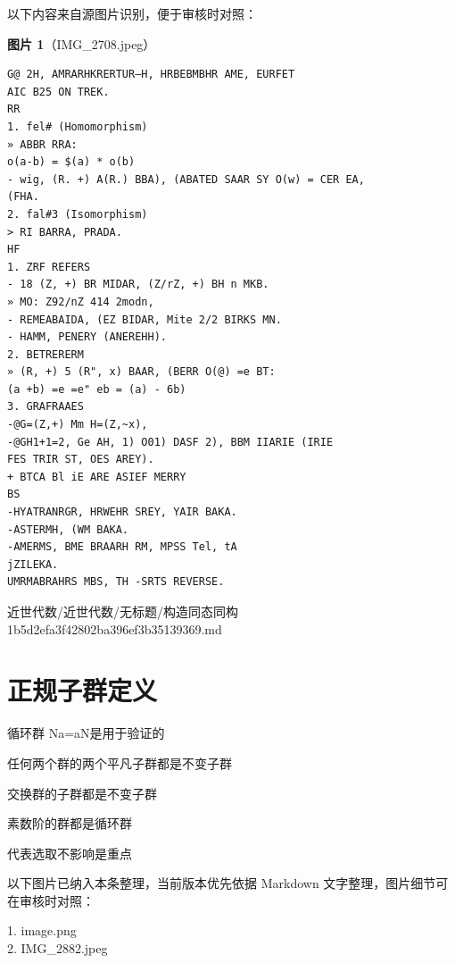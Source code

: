 \begin{note}
以下内容来自源图片识别，便于审核时对照：

\textbf{图片 1}（IMG\_2708.jpeg）
\begin{Verbatim}[fontsize=\small]
G@ 2H, AMRARHKRERTUR—H, HRBEBMBHR AME, EURFET
AIC B25 ON TREK.
RR
1. fel# (Homomorphism)
» ABBR RRA:
o(a-b) = $(a) * o(b)
- wig, (R. +) A(R.) BBA), (ABATED SAAR SY O(w) = CER EA,
(FHA.
2. fal#3 (Isomorphism)
> RI BARRA, PRADA.
HF
1. ZRF REFERS
- 18 (Z, +) BR MIDAR, (Z/rZ, +) BH n MKB.
» MO: Z92/nZ 414 2modn,
- REMEABAIDA, (EZ BIDAR, Mite 2/2 BIRKS MN.
- HAMM, PENERY (ANEREHH).
2. BETRERERM
» (R, +) 5 (R", x) BAAR, (BERR O(@) =e BT:
(a +b) =e =e" eb = (a) - 6b)
3. GRAFRAAES
-@G=(Z,+) Mm H=(Z,~x),
-@GH1+1=2, Ge AH, 1) O01) DASF 2), BBM IIARIE (IRIE
FES TRIR ST, OES AREY).
+ BTCA Bl iE ARE ASIEF MERRY
BS
-HYATRANRGR, HRWEHR SREY, YAIR BAKA.
-ASTERMH, (WM BAKA.
-AMERMS, BME BRAARH RM, MPSS Tel, tA
jZILEKA.
UMRMABRAHRS MBS, TH -SRTS REVERSE.
\end{Verbatim}

\end{note}

\begin{note}[来源路径]

近世代数/近世代数/无标题/构造同态同构 1b5d2efa3f42802ba396ef3b35139369.md

\end{note}

\section*{正规子群定义}

\begin{definition}[正规子群定义]

循环群 Na=aN是用于验证的

任何两个群的两个平凡子群都是不变子群

交换群的子群都是不变子群

素数阶的群都是循环群

代表选取不影响是重点

\end{definition}

\begin{note}[关联图片]
以下图片已纳入本条整理，当前版本优先依据 Markdown 文字整理，图片细节可在审核时对照：

1. image.png\\
2. IMG\_2882.jpeg\\

\end{note}

